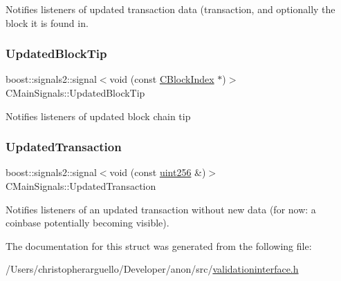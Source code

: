 Notifies listeners of updated transaction data (transaction, and optionally the block it is found in. \mbox{\label{struct_c_main_signals_a0380ea185992a8ee3572b5cf2aaa7677}} 
\subsubsection{\texorpdfstring{Updated\+Block\+Tip}{UpdatedBlockTip}}
{\footnotesize\ttfamily boost\+::signals2\+::signal$<$void (const \mbox{\hyperlink{class_c_block_index}{C\+Block\+Index}} $\ast$)$>$ C\+Main\+Signals\+::\+Updated\+Block\+Tip}

Notifies listeners of updated block chain tip \mbox{\label{struct_c_main_signals_a460e5e468e8e4a9493fe1685b77c57e0}} 
\subsubsection{\texorpdfstring{Updated\+Transaction}{UpdatedTransaction}}
{\footnotesize\ttfamily boost\+::signals2\+::signal$<$void (const \mbox{\hyperlink{classuint256}{uint256}} \&)$>$ C\+Main\+Signals\+::\+Updated\+Transaction}

Notifies listeners of an updated transaction without new data (for now\+: a coinbase potentially becoming visible). 

The documentation for this struct was generated from the following file\+:\begin{DoxyCompactItemize}
\item 
/\+Users/christopherarguello/\+Developer/anon/src/\mbox{\hyperlink{validationinterface_8h}{validationinterface.\+h}}\end{DoxyCompactItemize}
